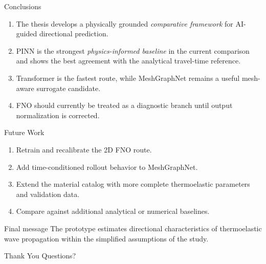 \documentclass[aspectratio=169,10pt]{beamer}
\begin{document}
\begin{frame}{Conclusions}
  \begin{enumerate}
    \item The thesis develops a physically grounded
          \emph{comparative framework} for AI-guided directional prediction.
    \item PINN is the strongest \emph{physics-informed baseline} in the
          current comparison and shows the best agreement with the analytical
          travel-time reference.
    \item Transformer is the fastest route, while MeshGraphNet remains a
          useful mesh-aware surrogate candidate.
    \item FNO should currently be treated as a diagnostic branch until
          output normalization is corrected.
  \end{enumerate}
\end{frame}

\begin{frame}{Future Work}
  \begin{enumerate}
    \item Retrain and recalibrate the 2D FNO route.
    \item Add time-conditioned rollout behavior to MeshGraphNet.
    \item Extend the material catalog with more complete thermoelastic
          parameters and validation data.
    \item Compare against additional analytical or numerical baselines.
  \end{enumerate}
  \vskip 8pt
  \begin{exampleblock}{Final message}
    The prototype estimates directional characteristics of thermoelastic
    wave propagation within the simplified assumptions of the study.
  \end{exampleblock}
\end{frame}

\begin{frame}{Thank You}
  \centering
  \Large Questions?
\end{frame}
\end{document}
